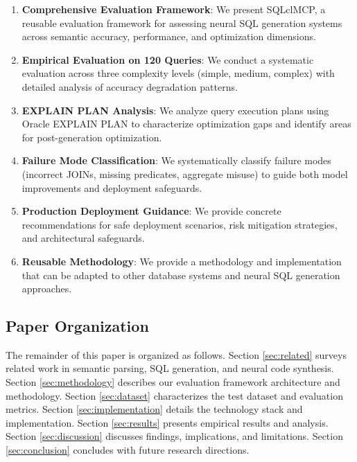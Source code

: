 \begin{enumerate}
    \item \textbf{Comprehensive Evaluation Framework}: We present SQLclMCP, a reusable evaluation framework for assessing neural SQL generation systems across semantic accuracy, performance, and optimization dimensions.
    
    \item \textbf{Empirical Evaluation on 120 Queries}: We conduct a systematic evaluation across three complexity levels (simple, medium, complex) with detailed analysis of accuracy degradation patterns.
    
    \item \textbf{EXPLAIN PLAN Analysis}: We analyze query execution plans using Oracle EXPLAIN PLAN to characterize optimization gaps and identify areas for post-generation optimization.
    
    \item \textbf{Failure Mode Classification}: We systematically classify failure modes (incorrect JOINs, missing predicates, aggregate misuse) to guide both model improvements and deployment safeguards.
    
    \item \textbf{Production Deployment Guidance}: We provide concrete recommendations for safe deployment scenarios, risk mitigation strategies, and architectural safeguards.
    
    \item \textbf{Reusable Methodology}: We provide a methodology and implementation that can be adapted to other database systems and neural SQL generation approaches.
\end{enumerate}

\subsection{Paper Organization}

The remainder of this paper is organized as follows. Section \ref{sec:related} surveys related work in semantic parsing, SQL generation, and neural code synthesis. Section \ref{sec:methodology} describes our evaluation framework architecture and methodology. Section \ref{sec:dataset} characterizes the test dataset and evaluation metrics. Section \ref{sec:implementation} details the technology stack and implementation. Section \ref{sec:results} presents empirical results and analysis. Section \ref{sec:discussion} discusses findings, implications, and limitations. Section \ref{sec:conclusion} concludes with future research directions.
